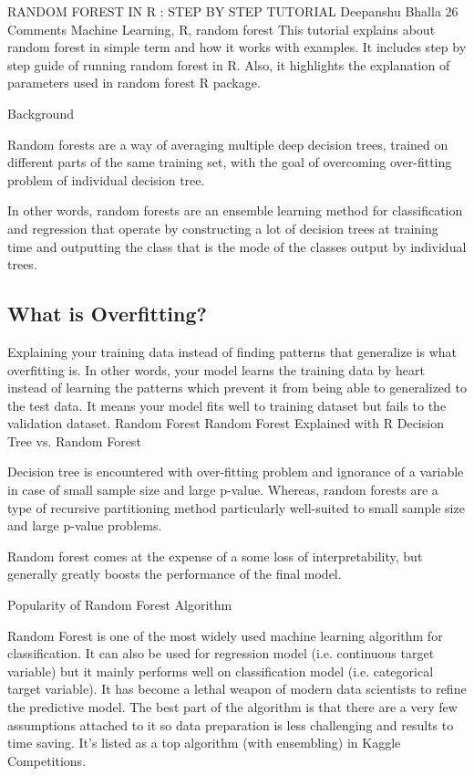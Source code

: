 RANDOM FOREST IN R : STEP BY STEP TUTORIAL
Deepanshu Bhalla  26 Comments  Machine Learning, R, random forest
This tutorial explains about random forest in simple term and how it works with examples. It includes step by step guide of running random forest in R. Also, it highlights the explanation of parameters used in random forest R package.

Background

Random forests are a way of averaging multiple deep decision trees, trained on different parts of the same training set, with the goal of overcoming over-fitting problem of individual decision tree.

In other words, random forests are an ensemble learning method for classification and regression that operate by constructing a lot of decision trees at training time and outputting the class that is the mode of the classes output by individual trees.

\subsection*{What is Overfitting?}
Explaining your training data instead of finding patterns that generalize is what overfitting is. In other words, your model learns the training data by heart instead of learning the patterns which prevent it from being able to generalized to the test data. It means your model fits well to training dataset but fails to the validation dataset.
Random Forest
Random Forest Explained with R
Decision Tree vs. Random Forest

Decision tree is encountered with over-fitting problem and ignorance of a variable in case of small sample size and large p-value. Whereas, random forests are a type of recursive partitioning method particularly well-suited to small sample size and large p-value problems.

Random forest comes at the expense of a some loss of interpretability, but generally greatly boosts the performance of the final model.

Popularity of Random Forest Algorithm

Random Forest is one of the most widely used machine learning algorithm for classification. It can also be used for regression model (i.e. continuous target variable) but it mainly performs well on classification model (i.e. categorical target variable). It has become a lethal weapon of modern data scientists to refine the predictive model. The best part of the algorithm is that there are a very few assumptions attached to it so data preparation is less challenging and results to time saving. It's listed as a top algorithm (with ensembling) in Kaggle Competitions.

